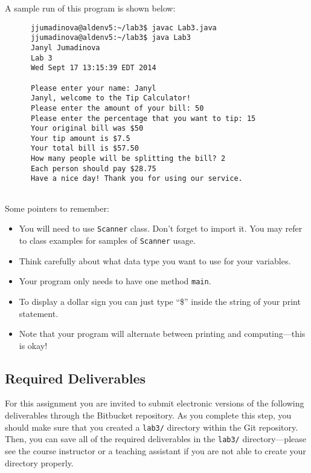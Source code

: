 A sample run of this program is shown below:
\begin{verbatim}
      jjumadinova@aldenv5:~/lab3$ javac Lab3.java
      jjumadinova@aldenv5:~/lab3$ java Lab3
      Janyl Jumadinova
      Lab 3
      Wed Sept 17 13:15:39 EDT 2014
      
      Please enter your name: Janyl
      Janyl, welcome to the Tip Calculator!
      Please enter the amount of your bill: 50
      Please enter the percentage that you want to tip: 15
      Your original bill was $50
      Your tip amount is $7.5
      Your total bill is $57.50
      How many people will be splitting the bill? 2
      Each person should pay $28.75
      Have a nice day! Thank you for using our service.
   
\end{verbatim}
\vspace{-0.2in}
Some pointers to remember:
\begin{itemize}
\item You will need to use {\tt Scanner} class. Don't forget to import it. You may refer to class examples for samples of {\tt Scanner} usage. 
\item Think carefully about what data type you want to use for your variables.
\item Your program only needs to have one method {\tt main}.
\item To display a dollar sign you can just type ``\$'' inside the string of your print statement. 
\item Note that your program will alternate between printing and computing---this 
is okay!
\end{itemize}

\vspace{-0.2in}
\subsection*{Required Deliverables}
For this assignment you are invited to submit electronic versions of the following deliverables through the Bitbucket repository. As you complete this step, you should make sure that you
created a {\tt lab3/} directory within the Git repository.  Then, you can save all of the required deliverables in the
{\tt lab3/} directory---please see the course instructor or a teaching assistant if you are not able to create your
directory properly. 

